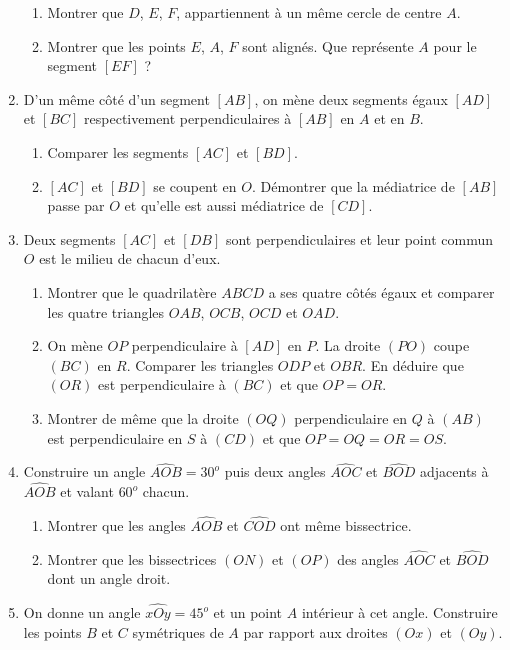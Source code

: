 \documentclass[12 pt]{report}
\theoremstyle{plain}
\newcounter{n}
\begin{document}
\begin{enumerate}
\begin{enumerate}
 \item Montrer que $D$, $E$, $F$, appartiennent à un même cercle de centre $A$.
 \item Montrer que les points $E$, $A$, $F$ sont alignés. Que représente $A$ pour le segment $[EF]$ ?
 \end{enumerate}
 \item D'un même côté d'un segment $[AB]$, on mène deux segments égaux $[AD]$ et $[BC]$ respectivement perpendiculaires à $[AB]$ en $A$ et en $B$.
 \begin{enumerate}
 \item Comparer les segments $[AC]$ et $[BD]$. 
 \item $[AC]$ et $[BD]$ se coupent en $O$. Démontrer que la médiatrice de $[AB]$ passe par $O$ et qu'elle est aussi médiatrice de $[CD]$.
 \end{enumerate}
 \item Deux segments $[AC]$ et $[DB]$ sont perpendiculaires et leur point commun
 $O$ est le milieu de chacun d'eux. \begin{enumerate}
 \item Montrer que le quadrilatère $ABCD$ a ses quatre côtés égaux et comparer les 
 quatre triangles $OAB$, $OCB$, $OCD$ et $OAD$.
 \item On mène $OP$ perpendiculaire à $[AD]$ en $P$. La droite $(PO)$ coupe $(BC)$ en 
 $R$. Comparer les triangles $ODP$ et $OBR$. En déduire que $(OR)$ est perpendiculaire à $(BC)$ et que $OP=OR$. 
 \item Montrer de même que la droite $(OQ)$ perpendiculaire en $Q$ à $(AB)$ est 
 perpendiculaire en $S$ à $(CD)$ et que $OP=OQ=OR=OS$. 
 \end{enumerate}
 \item Construire un angle $\widehat{AOB}=30^o$ puis deux angles $\widehat{AOC}$ et
 $\widehat{BOD}$ adjacents à $\widehat{AOB}$ et valant $60^o$ chacun. \begin{enumerate}
 \item Montrer que les angles $\widehat{AOB}$ et $\widehat{COD}$ ont même bissectrice.
 \item Montrer que les bissectrices $(ON)$ et $(OP)$ des angles $\widehat{AOC}$ et $\widehat{BOD}$ dont un angle droit.
 \end{enumerate}
 \item On donne un angle $\widehat{xOy}=45^o$ et un point $A$ intérieur à cet angle.
 Construire les points $B$ et $C$ symétriques de $A$ par rapport aux droites
 $(Ox)$ et $(Oy)$.\begin{enumerate}

\end{enumerate}
\end{enumerate}
\end{document}
